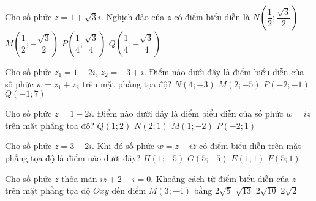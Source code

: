 \begin{ex}%
	Cho số phức $z = 1 + \sqrt{3}i$. Nghịch đảo của $z$ có điểm biểu diễn là
	\choice
	{$N\left(\dfrac{1}{2};\dfrac{\sqrt{3}}{2}\right)$}
	{$M\left(\dfrac{1}{2};-\dfrac{\sqrt{3}}{2}\right)$}
	{$P\left(\dfrac{1}{4};\dfrac{\sqrt{3}}{4}\right)$}
	{\True $Q\left(\dfrac{1}{4};-\dfrac{\sqrt{3}}{4}\right)$}
\end{ex}

\begin{ex}%
	Cho số phức $z_1 = 1-2i$, $z_2 = -3+i$. Điểm nào dưới đây là điểm biểu diễn của số phức $w= z_1+z_2$ trên mặt phẳng tọa độ?
	\choice
	{$N(4;-3)$}
	{$M(2;-5)$}
	{\True $P(-2;-1)$}
	{$Q(-1;7)$}
\end{ex}

\begin{ex}%
	Cho số phức $z = 1-2i$. Điểm nào dưới đây là điểm biểu diễn của số phức $w=iz$ trên mặt phẳng tọa độ?
	\choice
	{$Q(1;2)$}
	{\True $N(2;1)$}
	{$M(1;-2)$}
	{$P(-2;1)$}
\end{ex}

\begin{ex}%
	Cho số phức $z = 3-2i$. Khi đó số phức $w = z +i\overline{z}$ có điểm biểu diễn trên mặt phẳng tọa độ là điểm nào dưới đây?
	\choice
	{$H(1;-5)$}
	{$G(5;-5)$}
	{\True $E(1;1)$}
	{$F(5;1)$}
\end{ex}

\begin{ex}%
	Cho số phức $z$ thỏa mãn $iz + 2-i=0$. Khoảng cách từ điểm biểu diễn của $z$ trên mặt phẳng tọa độ $Oxy$ đến điểm $M(3;-4)$ bằng
	\choice
	{$2\sqrt{5}$}
	{$\sqrt{13}$}
	{\True $2\sqrt{10}$}
	{$2\sqrt{2}$}
\end{ex}


